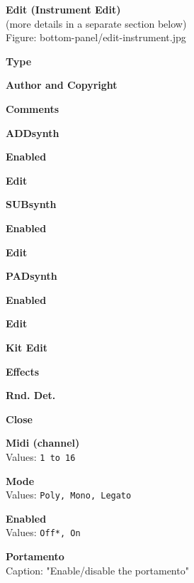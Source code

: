 \documentclass[
 11pt,
 twoside,
 a4paper,
 headinclude,
 footinclude,
 final                                 %
]{article}
\begin{document}
\begin{enumber}
\begin{enumber}
      \item \textbf{Edit (Instrument Edit)} \\
         (more details in a separate section below) \\
         Figure: bottom-panel/edit-instrument.jpg
      \begin{enumber}
         \item \textbf{Type}
         \item \textbf{Author and Copyright}
         \item \textbf{Comments}
         \item \textbf{ADDsynth}
         \begin{enumber}
            \item \textbf{Enabled}
            \item \textbf{Edit}
         \end{enumber}
         \item \textbf{SUBsynth}
         \begin{enumber}
            \item \textbf{Enabled}
            \item \textbf{Edit}
         \end{enumber}
         \item \textbf{PADsynth}
         \begin{enumber}
            \item \textbf{Enabled}
            \item \textbf{Edit}
         \end{enumber}
         \item \textbf{Kit Edit}
         \item \textbf{Effects}
         \item \textbf{Rnd. Det.}
         \item \textbf{Close}
      \end{enumber}
      \item \textbf{Midi (channel)} \\
         Values: \texttt{1 to 16}
      \item \textbf{Mode} \\
         Values: \texttt{Poly, Mono, Legato}
      \item \textbf{Enabled} \\
         Values: \texttt{Off*, On}
      \item \textbf{Portamento} \\
         Caption: "Enable/disable the portamento" \\

\end{enumber}
\end{enumber}
\end{document}
